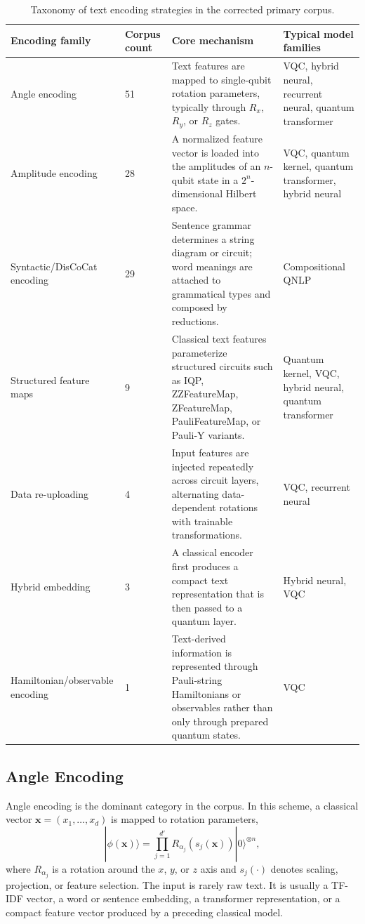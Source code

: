 \documentclass{ieeeaccess}
\begin{document}
\begin{table}[t]
\caption{Taxonomy of text encoding strategies in the corrected primary corpus.}
\label{tab:encoding_taxonomy}
\centering
\scriptsize
\begin{tabular}{@{}p{} p{} p{} p{}@{}}
\hline
\textbf{Encoding family} & \textbf{Corpus count} & \textbf{Core mechanism} & \textbf{Typical model families} \\
\hline
Angle encoding & 51 & Text features are mapped to single-qubit rotation parameters, typically through $R_x$, $R_y$, or $R_z$ gates. & VQC, hybrid neural, recurrent neural, quantum transformer \\
Amplitude encoding & 28 & A normalized feature vector is loaded into the amplitudes of an $n$-qubit state in a $2^n$-dimensional Hilbert space. & VQC, quantum kernel, quantum transformer, hybrid neural \\
Syntactic/DisCoCat encoding & 29 & Sentence grammar determines a string diagram or circuit; word meanings are attached to grammatical types and composed by reductions. & Compositional QNLP \\
Structured feature maps & 9 & Classical text features parameterize structured circuits such as IQP, ZZFeatureMap, ZFeatureMap, PauliFeatureMap, or Pauli-Y variants. & Quantum kernel, VQC, hybrid neural, quantum transformer \\
Data re-uploading & 4 & Input features are injected repeatedly across circuit layers, alternating data-dependent rotations with trainable transformations. & VQC, recurrent neural \\
Hybrid embedding & 3 & A classical encoder first produces a compact text representation that is then passed to a quantum layer. & Hybrid neural, VQC \\
Hamiltonian/observable encoding & 1 & Text-derived information is represented through Pauli-string Hamiltonians or observables rather than only through prepared quantum states. & VQC \\
\hline
\end{tabular}
\end{table}

\subsection{Angle Encoding}
\label{subsec:angle_encoding}

Angle encoding is the dominant category in the corpus. In this scheme, a classical vector $\mathbf{x} = (x_1,\ldots,x_d)$ is mapped to rotation parameters,
\begin{equation}
|\phi(\mathbf{x})\rangle =
\prod_{j=1}^{d'} R_{\alpha_j}(s_j(\mathbf{x})) |0\rangle^{\otimes n},
\end{equation}
where $R_{\alpha_j}$ is a rotation around the $x$, $y$, or $z$ axis and $s_j(\cdot)$ denotes scaling, projection, or feature selection. The input is rarely raw text. It is usually a TF-IDF vector, a word or sentence embedding, a transformer representation, or a compact feature vector produced by a preceding classical model.
\end{document}
